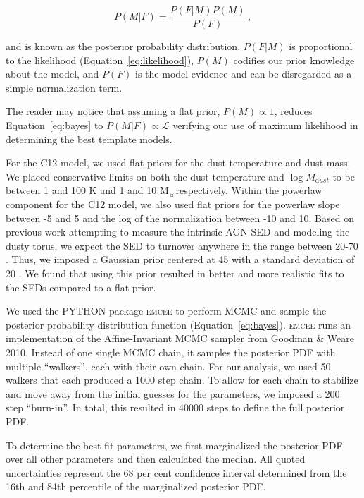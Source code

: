 \documentclass[fleqn, usenatbib]{mnras}
\newcommand{\msun}{M$_{\sun}$}
\begin{document}
\begin{equation}\label{eq:bayes}
P(M|F) = \frac{P(F|M)P(M)}{P(F)}\,,
\end{equation}

\noindent and is known as the posterior probability distribution. $P(F|M)$ is proportional to the likelihood (Equation~\ref{eq:likelihood}), $P(M)$ codifies our prior knowledge about the model, and $P(F)$ is the model evidence and can be disregarded as a simple normalization term. 

The reader may notice that assuming a flat prior, $P(M) \propto 1$, reduces Equation~\ref{eq:bayes} to $P(M|F) \propto \mathcal{L}$ verifying our use of maximum likelihood in determining the best template models.

For the C12 model, we used flat priors for the dust temperature and dust mass. We placed conservative limits on both the dust temperature and $\log M_{\mathrm dust}$ to be between 1 and 100 K and 1 and 10 \msun respectively. Within the powerlaw component for the C12 model, we also used flat priors for the powerlaw slope between -5 and 5 and the log of the normalization between -10 and 10. Based on previous work attempting to measure the intrinsic AGN SED and modeling the dusty torus, we expect the SED to turnover anywhere in the range between 20-70 \micron. Thus, we imposed a Gaussian prior centered at 45 \micron{} with a standard deviation of 20 \micron. We found that using this prior resulted in better and more realistic fits to the SEDs compared to a flat prior.

We used the \textsc{PYTHON} package \textsc{emcee} \citep{Foreman-Mackey:2013lr} to perform MCMC and sample the posterior probability distribution function (Equation~\ref{eq:bayes}). \textsc{emcee} runs an implementation of the Affine-Invariant MCMC sampler from Goodman \& Weare 2010. Instead of one single MCMC chain, it samples the posterior PDF with multiple ``walkers'', each with their own chain. For our analysis, we used 50 walkers that each produced a 1000 step chain. To allow for each chain to stabilize and move away from the initial guesses for the parameters, we imposed a 200 step ``burn-in''. In total, this resulted in 40000 steps to define the full posterior PDF. 

To determine the best fit parameters, we first marginalized the posterior PDF over all other parameters and then calculated the median. All quoted uncertainties represent the 68 per cent confidence interval determined from the 16th and 84th percentile of the marginalized posterior PDF.
\end{document}
